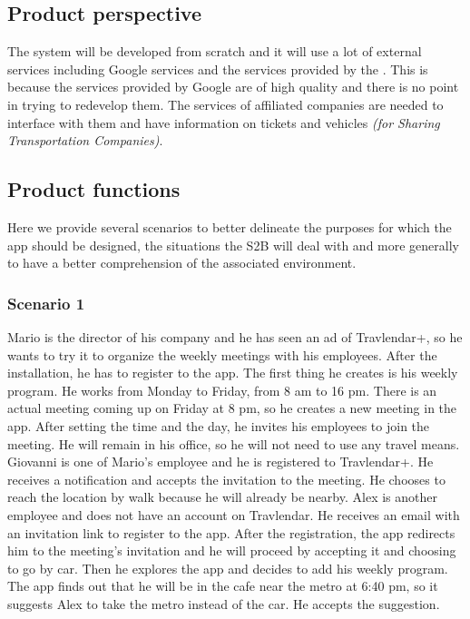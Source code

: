 \subsection{Product perspective}
	The system will be developed from scratch and it will use a lot of external services including Google services and the services provided by the . This is because the services provided by Google are of high quality and there is no point in trying to redevelop them. The services of affiliated companies are needed to interface with them and have information on tickets and vehicles \textit{(for Sharing Transportation Companies)}.
\subsection{Product functions}
Here we provide several scenarios to better delineate the purposes for which the app should be designed, the situations the S2B will deal with and more generally to have a better comprehension of the associated environment.

	\subsubsection{Scenario 1}
	Mario is the director of his company and he has seen an ad of Travlendar+, so he wants to try it to organize the weekly meetings with his employees. After the installation, he has to register to the app. The first thing he creates is his weekly program. He works from Monday to Friday, from 8 am to 16 pm.\newline
	There is an actual meeting coming up on Friday at 8 pm, so he creates a new	meeting in the app. After setting the time and the day, he invites his employees to join the meeting. He will remain in his office, so he will not need to use	any travel means.\newline
	Giovanni is one of Mario's employee and he is registered to Travlendar+. He receives a notification and accepts the invitation to the meeting. He chooses to reach the location by walk because he will already be nearby.\newline
	Alex is another employee and does not have an account on Travlendar. He receives an email with an invitation link to register to the app. After the registration, the app redirects him to the meeting's invitation and he will proceed by accepting it and choosing to go by car. Then he explores the app and decides to add his weekly program. The app finds out that he will be in the cafe near the metro at 6:40 pm, so it suggests Alex to take the metro instead of the car. He accepts the suggestion.
